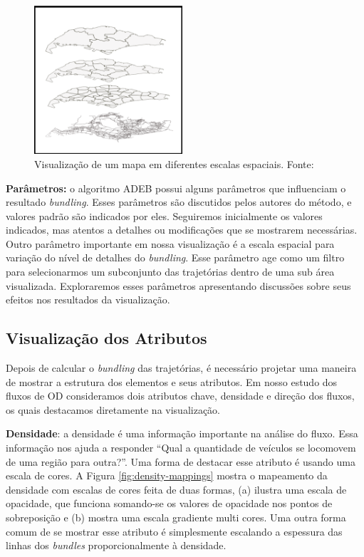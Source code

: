 \begin{figure}[!htb]
  \centering
  \includegraphics[width=55mm]{../figuras/multi-scale.png}
  \caption[Visualização de um mapa em diferentes escalas espaciais]{Visualização de um mapa em diferentes escalas espaciais. Fonte: \citet{Zeng2013}}
  \label{fig:multi-scale}
\end{figure}

\textbf{Parâmetros:} o algoritmo ADEB possui alguns parâmetros que
influenciam o resultado \emph{bundling}. Esses parâmetros são discutidos pelos
autores do método, e valores padrão são indicados por eles. Seguiremos
inicialmente os valores indicados, mas atentos a detalhes ou modificações que
se mostrarem necessárias. Outro parâmetro importante em nossa visualização é a
escala espacial para variação do nível de detalhes do \emph{bundling}. Esse
parâmetro age como um filtro para selecionarmos um subconjunto das trajetórias
dentro de uma sub área visualizada. Exploraremos esses parâmetros apresentando
discussões sobre seus efeitos nos resultados da visualização.

\subsection{Visualização dos Atributos}
Depois de calcular o \emph{bundling} das trajetórias, é necessário projetar uma
maneira de mostrar a estrutura dos elementos e seus atributos. Em nosso estudo
dos fluxos de OD consideramos dois atributos chave, densidade e direção dos
fluxos, os quais destacamos diretamente na visualização.

\textbf{Densidade}: a densidade é uma informação importante na análise do
fluxo. Essa informação nos ajuda a responder ``Qual a quantidade de veículos se
locomovem de uma região para outra?''. Uma forma de destacar esse atributo é
usando uma escala de cores. A Figura \ref{fig:density-mappings} mostra o
mapeamento da densidade com escalas de cores feita de duas formas, (a) ilustra
uma escala de opacidade, que funciona somando-se os valores de opacidade nos
pontos de sobreposição e (b) mostra uma escala gradiente multi cores. Uma outra
forma comum de se mostrar esse atributo é simplesmente escalando a espessura
das linhas dos \emph{bundles} proporcionalmente à densidade.

